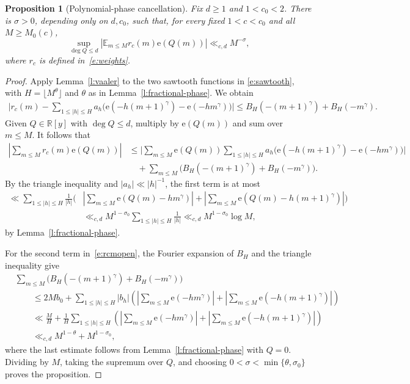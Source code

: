 \documentclass{amsart}
\newcommand{\E}{\mathbb E}
\newcommand{\1}{\mathbf 1}
\newcommand{\e}{\mathrm e}
\newtheorem{proposition}[theorem]{Proposition}
\begin{document}
\begin{proposition}[Polynomial-phase cancellation]\label{p:phase}
Fix $d\geq1$ and $1<c_0<2$.  There is $\sigma>0$, depending only on
$d,c_0$, such that, for every fixed $1<c<c_0$ and all \(M\geq M_0(c)\),
\begin{equation}\label{e:phase-cancellation}
 \sup_{\deg Q\leq d}
 \left|\E_{m\leq M}r_c(m)\e(Q(m))\right|
 \ll_{c,d}M^{-\sigma},
\end{equation}
where \(r_c\) is defined in~\eqref{e:weights}.
\end{proposition}

\begin{proof}
Apply Lemma~\ref{l:vaaler} to the two sawtooth functions in
\eqref{e:sawtooth}, with $H=\lfloor M^\theta\rfloor$ and $\theta$ as
in Lemma~\ref{l:fractional-phase}.  We obtain
\begin{align*}
 \bigg|r_c(m)-\sum_{1\leq|h|\leq H}a_h\bigl(
 \e(-h(m+1)^\gamma)-\e(-hm^\gamma)\bigr)\bigg|
 \leq B_H(-(m+1)^\gamma)+B_H(-m^\gamma).
\end{align*}
Given $Q\in\mathbb R[y]$ with $\deg Q\leq d$, multiply by
$\e(Q(m))$ and sum over $m\leq M$.  It follows that
\begin{align}\label{e:rcmopen}
 \left|\sum_{m\leq M}r_c(m)\e(Q(m))\right|
 &\leq\bigg|\sum_{m\leq M}\e(Q(m))
 \sum_{1\leq|h|\leq H}a_h\bigl(
 \e(-h(m+1)^\gamma)-\e(-hm^\gamma)\bigr)\bigg|\nonumber\\
 &\quad+\sum_{m\leq M}\bigl(
 B_H(-(m+1)^\gamma)+B_H(-m^\gamma)\bigr).
\end{align}
By the triangle inequality and $|a_h|\ll|h|^{-1}$, the first term is
at most
\begin{align*}
 \ll\sum_{1\leq|h|\leq H}\frac1{|h|}\bigg(&
 \left|\sum_{m\leq M}\e(Q(m)-hm^\gamma)\right|
 +\left|\sum_{m\leq M}\e(Q(m)-h(m+1)^\gamma)\right|\bigg)\\
 &\ll_{c,d}M^{1-\sigma_0}
 \sum_{1\leq|h|\leq H}\frac1{|h|}
 \ll_{c,d}M^{1-\sigma_0}\log M,
\end{align*}
by Lemma~\ref{l:fractional-phase}.

For the second term in~\eqref{e:rcmopen}, the Fourier expansion of
$B_H$ and the triangle inequality give
\begin{align*}
 &\sum_{m\leq M}\bigl(
 B_H(-(m+1)^\gamma)+B_H(-m^\gamma)\bigr)\\
 &\qquad\leq 2Mb_0+
 \sum_{1\leq|h|\leq H}|b_h|
 \left(\left|\sum_{m\leq M}\e(-hm^\gamma)\right|
 +\left|\sum_{m\leq M}\e(-h(m+1)^\gamma)\right|\right)\\
 &\qquad\ll \frac{M}{H}+\frac1H
 \sum_{1\leq|h|\leq H}
 \left(\left|\sum_{m\leq M}\e(-hm^\gamma)\right|
 +\left|\sum_{m\leq M}\e(-h(m+1)^\gamma)\right|\right)\\
 &\qquad\ll_{c,d}M^{1-\theta}+M^{1-\sigma_0},
\end{align*}
where the last estimate follows from
Lemma~\ref{l:fractional-phase} with $Q=0$.  Dividing by $M$, taking the
supremum over $Q$, and choosing
$0<\sigma<\min\{\theta,\sigma_0\}$ proves the proposition.
\end{proof}
\end{document}

